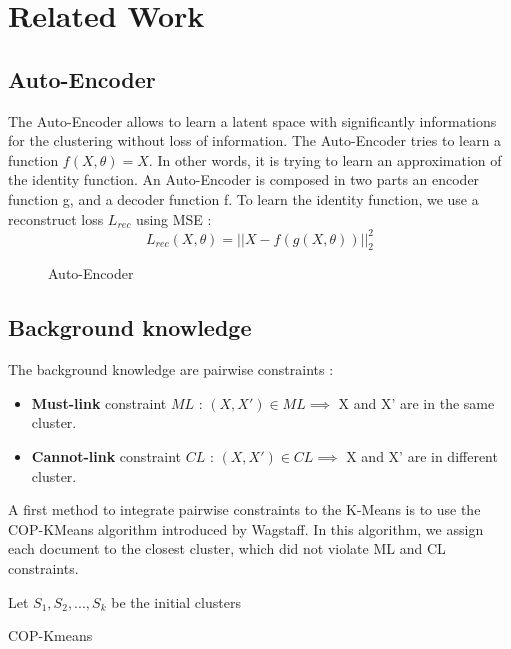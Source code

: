 \section{Related Work}\label{sec:related}

\subsection{Auto-Encoder}
The Auto-Encoder allows to learn a latent space with significantly informations 
for the clustering without loss of information. The Auto-Encoder tries to learn 
a function $f (X, \theta) = X$. In other words, it is trying to learn an 
approximation of the identity function. An Auto-Encoder is composed in two parts
an encoder function g, and a decoder function f.
To learn the identity function, we use a reconstruct loss $L_{rec}$ using MSE :
\begin{equation*}
  L_{rec}(X, \theta) = || X - f(g(X, \theta)) ||_2^2 
\end{equation*}

\begin{figure}
  \centering
  
  \caption{Auto-Encoder}
  \label{fig:AE}
\end{figure}
\subsection{Background knowledge}
The background knowledge are pairwise constraints :
\begin{itemize}
\item \textbf{Must-link} constraint $ML$ : $(X, X') \in ML \implies $ X and X' are in the
  same cluster.
\item \textbf{Cannot-link} constraint $CL$ : $(X, X') \in CL \implies $ X and X' are in
  different cluster.
\end{itemize}
A first method to integrate pairwise constraints to the K-Means is to use the 
COP-KMeans algorithm introduced by Wagstaff\cite{Wagstaff:2001:CKC:645530.655669}.
In this algorithm, we assign each document to the closest cluster, 
which did not violate ML and CL constraints.
\begin{algorithm}[!h]
  Let $S_1, S_2 , ..., S_k$ be the initial clusters\\
  \caption{COP-Kmeans}
\end{algorithm}

